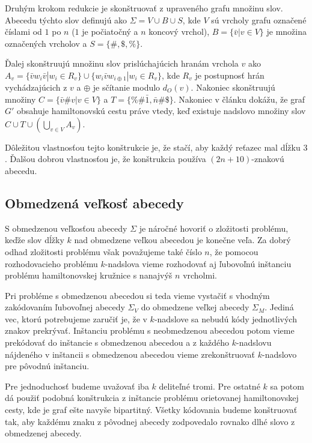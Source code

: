 Druhým krokom redukcie je skonštruovať z upraveného grafu množinu slov. Abecedu
týchto slov definujú ako $\Sigma = V \cup B \cup S$, kde $V$ sú vrcholy grafu označené
číslami od $1$ po $n$ ($1$ je počiatočný a $n$ koncový vrchol), $B = \{ \bar{v} | v \in V \}$
je množina označených vrcholov a $S = \{\#, \$, \% \}$.

Ďalej skonštruujú množinu slov prislúchajúcich hranám vrchola $v$ ako \\
$A_v = \{ \bar{v}w_i\bar{v} | w_i \in R_v\} \cup \{ w_i \bar{v} w_{i \oplus 1} | w_i \in R_v\}$,
kde $R_v$ je postupnosť hrán vychádzajúcich z $v$ a $\oplus$ je sčítanie modulo $d_O(v)$.
Nakoniec skonštruujú množiny $C = \{ \bar{v} \# v | v \in V\}$ a $T = \{ \% \# \bar{1}, \bar{n} \# \$\}$.
Nakoniec v článku dokážu, že graf $G'$ obsahuje hamiltonovskú cestu práve vtedy, keď
existuje nadslovo množiny slov $C \cup T \cup (\bigcup\limits_{v \in V} A_v)$.

Dôležitou vlastnosťou tejto konštrukcie je, že stačí, aby každý reťazec mal dĺžku $3$. Ďalšou dobrou
vlastnosťou je, že konštrukcia používa $(2n + 10)$-znakovú abecedu.

\subsection{Obmedzená veľkosť abecedy}

S obmedzenou veľkosťou abecedy $\Sigma$ je náročné hovoriť o zložitosti problému, keďže
slov dĺžky $k$ nad obmedzene veľkou abecedou je konečne veľa. Za dobrý odhad
zložitosti problému však považujeme také číslo $n$, že pomocou rozhodovacieho
problému $k$-nadslova vieme rozhodovať aj ľubovoľnú inštanciu problému
hamiltonovskej kružnice s nanajvýš $n$ vrcholmi.

Pri probléme s obmedzenou abecedou si teda vieme vystačiť s vhodným zakódovaním
ľubovoľnej abecedy $\Sigma_V$ do obmedzene veľkej abecedy $\Sigma_M$. Jediná vec, ktorú potrebujeme zaručiť
je, že v $k$-nadslove sa nebudú kódy jednotlivých znakov prekrývať. Inštanciu
problému s neobmedzenou abecedou potom vieme prekódovať do inštancie s obmedzenou
abecedou a z každého $k$-nadslovu nájdeného v inštancii s obmedzenou abecedou
vieme zrekonštruovať $k$-nadslovo pre pôvodnú inštanciu.

Pre jednoduchosť budeme uvažovať iba $k$ deliteľné tromi. Pre ostatné $k$ sa
potom dá použiť podobná konštrukcia z inštancie problému orietovanej hamiltonovskej cesty,
kde je graf ešte navyše bipartitný. Všetky kódovania budeme konštruovať tak, aby
každému znaku z pôvodnej abecedy zodpovedalo rovnako dlhé slovo z obmedzenej abecedy.

